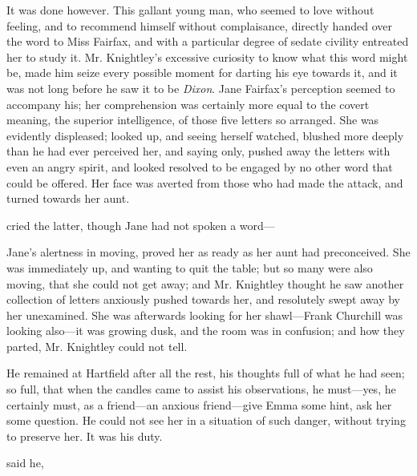 It was done however. This gallant young man, who seemed to love without feeling, and to recommend himself without complaisance, directly handed over the word to Miss Fairfax, and with a particular degree of sedate civility entreated her to study it. Mr. Knightley's excessive curiosity to know what this word might be, made him seize every possible moment for darting his eye towards it, and it was not long before he saw it to be {\em Dixon}. Jane Fairfax's perception seemed to accompany his; her comprehension was certainly more equal to the covert meaning, the superior intelligence, of those five letters so arranged. She was evidently displeased; looked up, and seeing herself watched, blushed more deeply than he had ever perceived her, and saying only,  pushed away the letters with even an angry spirit, and looked resolved to be engaged by no other word that could be offered. Her face was averted from those who had made the attack, and turned towards her aunt.

 cried the latter, though Jane had not spoken a word---

Jane's alertness in moving, proved her as ready as her aunt had preconceived. She was immediately up, and wanting to quit the table; but so many were also moving, that she could not get away; and Mr. Knightley thought he saw another collection of letters anxiously pushed towards her, and resolutely swept away by her unexamined. She was afterwards looking for her shawl---Frank Churchill was looking also---it was growing dusk, and the room was in confusion; and how they parted, Mr. Knightley could not tell.

He remained at Hartfield after all the rest, his thoughts full of what he had seen; so full, that when the candles came to assist his observations, he must---yes, he certainly must, as a friend---an anxious friend---give Emma some hint, ask her some question. He could not see her in a situation of such danger, without trying to preserve her. It was his duty.

 said he, 

